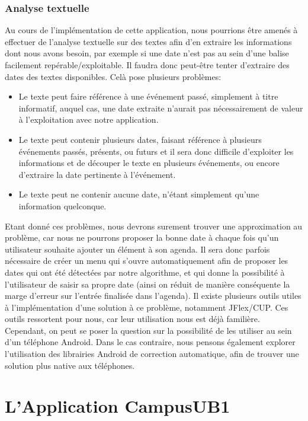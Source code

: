 \documentclass [pdftex,12pt] {report}
\begin{document}
\subsection{Analyse textuelle}
Au cours de l'implémentation de cette application, nous pourrions être amenés à effectuer de l'analyse textuelle sur des textes afin d'en extraire les informations dont nous avons besoin, par exemple si une date n'est pas au sein d'une balise facilement repérable/exploitable. Il faudra donc peut-être tenter d'extraire des dates des textes disponibles. Celà pose plusieurs problèmes:
\begin{itemize}
\renewcommand{\labelitemi}{$\bullet$}
  \item Le texte peut faire référence à une événement passé, simplement à titre informatif, auquel cas, une date extraite n'aurait pas nécessairement de valeur à l'exploitation avec notre application.
  \item Le texte peut contenir plusieurs dates, faisant référence à plusieurs événements passés, présents, ou futurs et il sera donc difficile d'exploiter les informations et de découper le texte en plusieurs événements, ou encore d'extraire la date pertinente à l'événement.
  \item Le texte peut ne contenir aucune date, n'étant simplement qu'une information quelconque.
\end{itemize}
Etant donné ces problèmes, nous devrons surement trouver une approximation au problème, car nous ne pourrons proposer la bonne date à chaque fois qu'un utilisateur souhaite ajouter un élément à son agenda. Il sera donc parfois nécessaire de créer un menu qui s'ouvre automatiquement afin de proposer les dates qui ont été détectées par notre algorithme, et qui donne la possibilité à l'utilisateur de saisir sa propre date (ainsi on réduit de manière conséquente la marge d'erreur sur l'entrée finalisée dans l'agenda).
Il existe plusieurs outils utiles à l'implémentation d'une solution à ce problème, notamment JFlex/CUP. Ces outils ressortent pour nous, car leur utilisation nous est déjà familière. Cependant, on peut se poser la question sur la possibilité de les utiliser au sein d'un téléphone Android. Dans le cas contraire, nous pensons également explorer l'utilisation des librairies Android de correction automatique, afin de trouver une solution plus native aux téléphones.


\chapter{L'Application CampusUB1}
\end{document}
